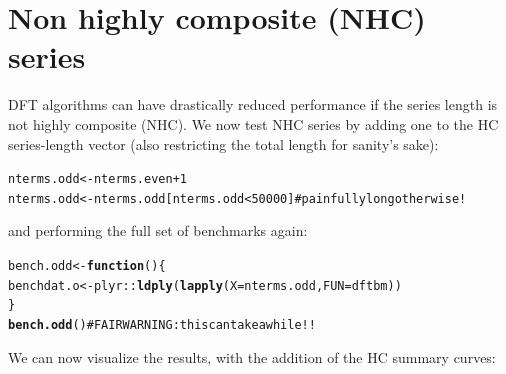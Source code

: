 \documentclass[12pt]{article}\usepackage{graphicx, color}
\makeatletter
\newcommand{\hlfunctioncall}[1]{\textcolor[rgb]{0.501960784313725,0,0.329411764705882}{\textbf{#1}}}%
\newcommand{\hlcomment}[1]{\textcolor[rgb]{0.180392156862745,0.6,0.341176470588235}{#1}}%
\newenvironment{kframe}{%
 \def\at@end@of@kframe{}%
 \ifinner\ifhmode%
  \def\at@end@of@kframe{\end{minipage}}%
  \begin{minipage}{\columnwidth}%
 \fi\fi%
 \def\FrameCommand##1{\hskip\@totalleftmargin \hskip-\fboxsep
 \colorbox{shadecolor}{##1}\hskip-\fboxsep
     \hskip-\linewidth \hskip-\@totalleftmargin \hskip\columnwidth}%
 \MakeFramed {\advance\hsize-\width
   \@totalleftmargin\z@ \linewidth\hsize
   \@setminipage}}%
 {\par\unskip\endMakeFramed%
 \at@end@of@kframe}
\newenvironment{knitrout}{}{} %
\makeatother
\begin{document}
\section{Non highly composite (NHC) series}
DFT algorithms can have drastically reduced performance
if the series length is not highly composite (NHC).
We now test NHC series by adding one to the HC series-length
vector (also restricting the total length for sanity's sake):
\begin{knitrout}
\color{fgcolor}\begin{kframe}
\begin{alltt}
nterms.odd <- nterms.even + 1
nterms.odd <- nterms.odd[nterms.odd < 50000]  \hlcomment{# painfully long otherwise!}
\end{alltt}
\end{kframe}
\end{knitrout}

and performing the full set of benchmarks again:
\begin{knitrout}
\color{fgcolor}\begin{kframe}
\begin{alltt}
bench.odd <- \hlfunctioncall{function}() \{
    benchdat.o <- plyr::\hlfunctioncall{ldply}(\hlfunctioncall{lapply}(X = nterms.odd, FUN = dftbm))
\}
\hlfunctioncall{bench.odd}()  \hlcomment{# FAIR WARNING: this can take a while!!}
\end{alltt}
\end{kframe}
\end{knitrout}


We can now visualize the results, with the addition of
the HC summary curves:
\end{document}
